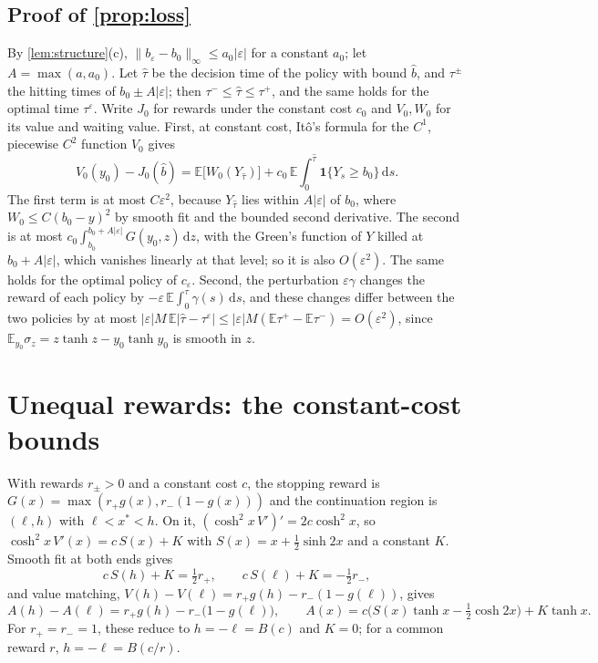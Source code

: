 \documentclass[11pt]{article}
\theoremstyle{definition}
\theoremstyle{remark}
\newcommand{\E}{\mathbb{E}}
\newcommand{\dd}{\,\mathrm{d}}
\begin{document}
\subsection{Proof of \texorpdfstring{\cref{prop:loss}}{Proposition }}

By \cref{lem:structure}(c), $\|b_\varepsilon - b_0\|_\infty \le a_0|\varepsilon|$ for a constant
$a_0$; let $A = \max(a, a_0)$. Let $\hat\tau$ be the decision time of the policy with bound
$\hat b$, and $\tau^\pm$ the hitting times of $b_0 \pm A|\varepsilon|$; then
$\tau^- \le \hat\tau \le \tau^+$, and the same holds for the optimal time $\tau^\varepsilon$. Write
$J_0$ for rewards under the constant cost $c_0$ and $V_0, W_0$ for its value and waiting value.
First, at constant cost, Itô's formula for the $C^1$, piecewise $C^2$ function $V_0$ gives
\begin{equation}
  V_0(y_0) - J_0(\hat b) = \E\bigl[W_0(Y_{\hat\tau})\bigr] + c_0\,\E\int_0^{\hat\tau}\mathbf 1\{Y_s \ge b_0\}\dd s.
\end{equation}
The first term is at most $C\varepsilon^2$, because $Y_{\hat\tau}$ lies within $A|\varepsilon|$ of
$b_0$, where $W_0 \le C(b_0 - y)^2$ by smooth fit and the bounded second derivative. The second is
at most $c_0\int_{b_0}^{b_0 + A|\varepsilon|} G(y_0, z)\dd z$, with the Green's function of $Y$
killed at $b_0 + A|\varepsilon|$, which vanishes linearly at that level; so it is also
$O(\varepsilon^2)$. The same holds for the optimal policy of $c_\varepsilon$. Second, the
perturbation $\varepsilon\gamma$ changes the reward of each policy by $-\varepsilon\,\E\int_0^\tau
\gamma(s)\dd s$, and these changes differ between the two policies by at most
$|\varepsilon|M\,\E|\hat\tau - \tau^\varepsilon| \le |\varepsilon|M(\E\tau^+ - \E\tau^-) =
O(\varepsilon^2)$, since $\E_{y_0}\sigma_z = z\tanh z - y_0\tanh y_0$ is smooth in $z$.

\section{Unequal rewards: the constant-cost bounds}
\label{app:lopsided}

With rewards $r_\pm > 0$ and a constant cost $c$, the stopping reward is
$G(x) = \max(r_+ g(x), r_-(1 - g(x)))$ and the continuation region is $(\ell, h)$ with
$\ell < x^* < h$. On it, $(\cosh^2 x\, V')' = 2c\cosh^2 x$, so
$\cosh^2 x\,V'(x) = c\,S(x) + K$ with $S(x) = x + \tfrac12\sinh 2x$ and a constant $K$. Smooth
fit at both ends gives
\begin{equation}
  c\,S(h) + K = \tfrac12 r_+, \qquad c\,S(\ell) + K = -\tfrac12 r_-,
\end{equation}
and value matching, $V(h) - V(\ell) = r_+ g(h) - r_-(1 - g(\ell))$, gives
\begin{equation}
  A(h) - A(\ell) = r_+ g(h) - r_-\bigl(1 - g(\ell)\bigr), \qquad
  A(x) = c\bigl(S(x)\tanh x - \tfrac12\cosh 2x\bigr) + K\tanh x.
\end{equation}
For $r_+ = r_- = 1$, these reduce to $h = -\ell = B(c)$ and $K = 0$; for a common reward $r$,
$h = -\ell = B(c/r)$.
\end{document}
